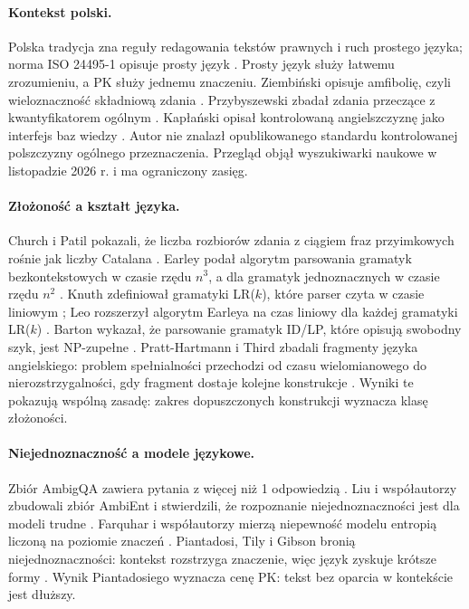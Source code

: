 \paragraph{Kontekst polski.}
Polska tradycja zna reguły redagowania tekstów prawnych \cite{ztp} i ruch prostego języka;
norma ISO 24495-1 opisuje prosty język \cite{iso24495}. Prosty język służy łatwemu
zrozumieniu, a PK służy jednemu znaczeniu. Ziembiński opisuje amfibolię, czyli wieloznaczność
składniową zdania \cite{ziembinski2002}. Przybyszewski zbadał zdania przeczące z kwantyfikatorem
ogólnym \cite{przybyszewski2020}. Kapłański opisał kontrolowaną angielszczyznę
jako interfejs baz wiedzy \cite{kaplanski2011}. Autor nie znalazł opublikowanego standardu
kontrolowanej polszczyzny ogólnego przeznaczenia. Przegląd objął wyszukiwarki naukowe
w listopadzie 2026 r. i ma ograniczony zasięg.

\paragraph{Złożoność a kształt języka.}
Church i Patil pokazali, że liczba rozbiorów zdania z ciągiem fraz przyimkowych rośnie jak
liczby Catalana \cite{church1982}. Earley podał algorytm parsowania gramatyk bezkontekstowych
w czasie rzędu $n^3$, a dla gramatyk jednoznacznych w czasie rzędu $n^2$ \cite{earley1970}.
Knuth zdefiniował gramatyki LR($k$), które parser czyta w czasie liniowym \cite{knuth1965};
Leo rozszerzył algorytm Earleya na czas liniowy dla każdej gramatyki LR($k$) \cite{leo1991}.
Barton wykazał, że parsowanie gramatyk ID/LP, które opisują swobodny szyk, jest NP-zupełne
\cite{barton1985}. Pratt-Hartmann i Third zbadali fragmenty języka angielskiego: problem
spełnialności przechodzi od czasu wielomianowego do nierozstrzygalności, gdy fragment
dostaje kolejne konstrukcje \cite{pratt2004,pratt2006}. Wyniki te pokazują wspólną zasadę:
zakres dopuszczonych konstrukcji wyznacza klasę złożoności.

\paragraph{Niejednoznaczność a modele językowe.}
Zbiór AmbigQA zawiera pytania z więcej niż 1 odpowiedzią \cite{min2020}. Liu i współautorzy
zbudowali zbiór AmbiEnt i stwierdzili, że rozpoznanie niejednoznaczności jest dla modeli
trudne \cite{liu2023}. Farquhar i współautorzy mierzą niepewność modelu entropią liczoną
na poziomie znaczeń \cite{farquhar2024}. Piantadosi, Tily i Gibson bronią
niejednoznaczności: kontekst rozstrzyga znaczenie, więc język zyskuje krótsze formy
\cite{piantadosi2012}. Wynik Piantadosiego wyznacza cenę PK: tekst bez oparcia w kontekście
jest dłuższy.


